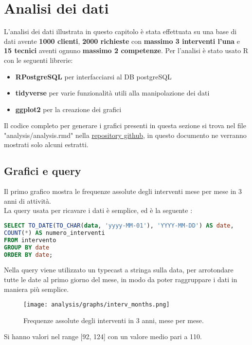 \documentclass{article}
\begin{document}
\newpage

\section{Analisi dei dati}

L'analisi dei dati illustrata in questo capitolo è stata effettuata su una base di dati avente \textbf{1000 clienti}, \textbf{2000 richieste} con \textbf{massimo 3 interventi l'una} e \textbf{15 tecnici} aventi ognuno \textbf{massimo 2 competenze}. Per l'analisi è stato usato R con le seguenti librerie:
\begin{itemize}
    \item \textbf{RPostgreSQL} per interfacciarsi al DB postgreSQL 
    \item \textbf{tidyverse} per varie funzionalità utili alla manipolazione dei dati
    \item \textbf{ggplot2} per la creazione dei grafici
\end{itemize}
Il codice completo per generare i grafici presenti in questa sezione si trova nel file "analysis/analysis.rmd" nella \href{https://github.com/kevchi9/uniud\_db24}{repository github}, in questo documento ne verranno mostrati solo alcuni estratti. 

\subsection{Grafici e query}

Il primo grafico mostra le frequenze assolute degli interventi mese per mese in 3 anni di attività.\\
La query usata per ricavare i dati è semplice, ed è la seguente :
\begin{lstlisting}[language=SQL]
SELECT TO_DATE(TO_CHAR(data, 'yyyy-MM-01'), 'YYYY-MM-DD') AS date,
COUNT(*) AS numero_interventi 
FROM intervento
GROUP BY date
ORDER BY date;
\end{lstlisting}
Nella query viene utilizzato un typecast a stringa sulla data, per arrotondare tutte le date al primo giorno del mese, in modo da poter raggruppare i dati in maniera più semplice.
\begin{figure}[h!]
    \texttt{[image: analysis/graphs/interv\_months.png]}
    \label{fig:data_analysis1}
    \caption{Frequenze assolute degli interventi in 3 anni, mese per mese.}
\end{figure}

Si hanno valori nel range [92, 124] con un valore medio pari a 110. 
\newpage
\end{document}
